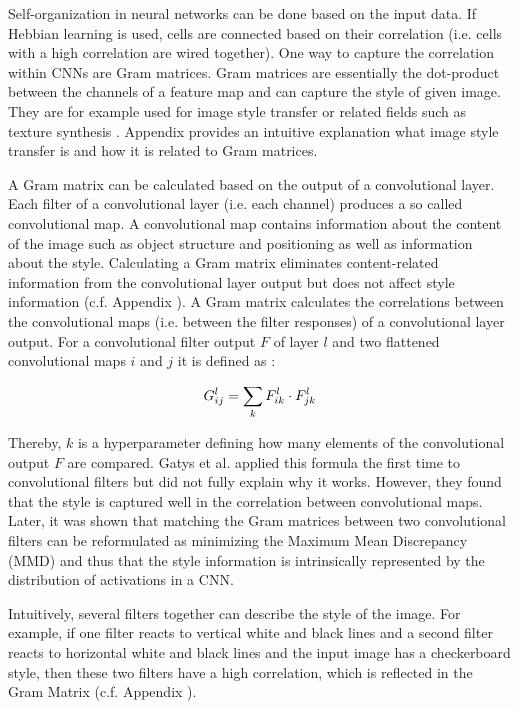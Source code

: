Self-organization in neural networks can be done based on the input data.
If Hebbian learning is used, cells are connected based on their correlation (i.e. cells with a high correlation are wired together).
One way to capture the correlation within CNNs are Gram matrices.
Gram matrices are essentially the dot-product between the channels of a feature map and can capture the style of given image.
They are for example used for image style transfer or related fields such as texture synthesis .
Appendix  provides an intuitive explanation what image style transfer is and how it is related to Gram matrices.

A Gram matrix can be calculated based on the output of a convolutional layer.
Each filter of a convolutional layer (i.e. each channel) produces a so called convolutional map.
A convolutional map contains information about the content of the image such as object structure and positioning as well as information about the style.
Calculating a Gram matrix eliminates content-related information from the convolutional layer output but does not affect style information (c.f. Appendix ).
A Gram matrix calculates the correlations between the convolutional maps (i.e. between the filter responses) of a convolutional layer output.
For a convolutional filter output $F$ of layer $l$ and two flattened convolutional maps $i$ and $j$ it is defined as :

\begin{equation}\eqlbl{Gram_mat}
		G_{ij}^{l} = \sum_k F^{l}_{ik} \cdot F^{l}_{jk}
\end{equation}%

Thereby, $k$ is a hyperparameter defining how many elements of the convolutional output $F$ are compared.
Gatys et al.  applied this formula the first time to convolutional filters but did not fully explain why it works.
However, they found that the style is captured well in the correlation between convolutional maps.
Later, it was shown  that matching the Gram matrices between two convolutional filters can be reformulated as minimizing the Maximum Mean Discrepancy (MMD)  and thus that the style information is intrinsically represented by the distribution of activations in a CNN.

Intuitively, several filters together can describe the style of the image.
For example, if one filter reacts to vertical white and black lines and a second filter reacts to horizontal white and black lines and the input image has a checkerboard style, then these two filters have a high correlation, which is reflected in the Gram Matrix (c.f. Appendix ).

